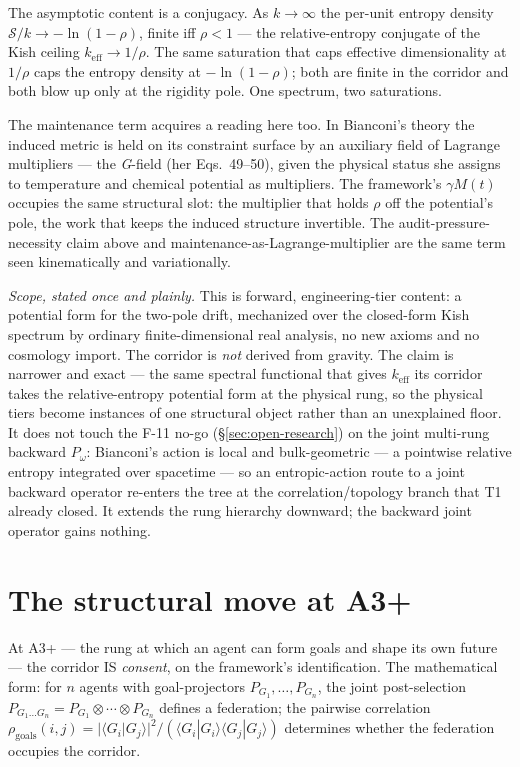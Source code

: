 \documentclass[11pt,a4paper]{article}
\newcommand{\keff}{k_{\text{eff}}}
\newcommand{\Pomega}{P_{\omega}}
\begin{document}
The asymptotic content is a conjugacy. As $k \to \infty$ the per-unit entropy density $\mathcal{S}/k \to -\ln(1-\rho)$, finite iff $\rho < 1$ --- the relative-entropy conjugate of the Kish ceiling $\keff \to 1/\rho$. The same saturation that caps effective dimensionality at $1/\rho$ caps the entropy density at $-\ln(1-\rho)$; both are finite in the corridor and both blow up only at the rigidity pole. One spectrum, two saturations.

The maintenance term acquires a reading here too. In Bianconi's theory the induced metric is held on its constraint surface by an auxiliary field of Lagrange multipliers --- the \emph{G}-field (her Eqs.\ 49--50), given the physical status she assigns to temperature and chemical potential as multipliers. The framework's $\gamma M(t)$ occupies the same structural slot: the multiplier that holds $\rho$ off the potential's pole, the work that keeps the induced structure invertible. The audit-pressure-necessity claim above and maintenance-as-Lagrange-multiplier are the same term seen kinematically and variationally.

\emph{Scope, stated once and plainly.} This is forward, engineering-tier content: a potential form for the two-pole drift, mechanized over the closed-form Kish spectrum by ordinary finite-dimensional real analysis, no new axioms and no cosmology import. The corridor is \emph{not} derived from gravity. The claim is narrower and exact --- the same spectral functional that gives $\keff$ its corridor takes the relative-entropy potential form at the physical rung, so the physical tiers become instances of one structural object rather than an unexplained floor. It does not touch the F-11 no-go (\S\ref{sec:open-research}) on the joint multi-rung backward $\Pomega$: Bianconi's action is local and bulk-geometric --- a pointwise relative entropy integrated over spacetime --- so an entropic-action route to a joint backward operator re-enters the tree at the correlation/topology branch that T1 already closed. It extends the rung hierarchy downward; the backward joint operator gains nothing.

\section{The structural move at A3+}\label{sec:a3-structural}

At A3+ --- the rung at which an agent can form goals and shape its own future --- the corridor IS \emph{consent}, on the framework's identification. The mathematical form: for $n$ agents with goal-projectors $P_{G_1}, \ldots, P_{G_n}$, the joint post-selection $P_{G_1 \ldots G_n} = P_{G_1} \otimes \cdots \otimes P_{G_n}$ defines a federation; the pairwise correlation $\rho_{\text{goals}}(i, j) = |\langle G_i | G_j \rangle|^2 / (\langle G_i | G_i \rangle \langle G_j | G_j \rangle)$ determines whether the federation occupies the corridor.
\end{document}
